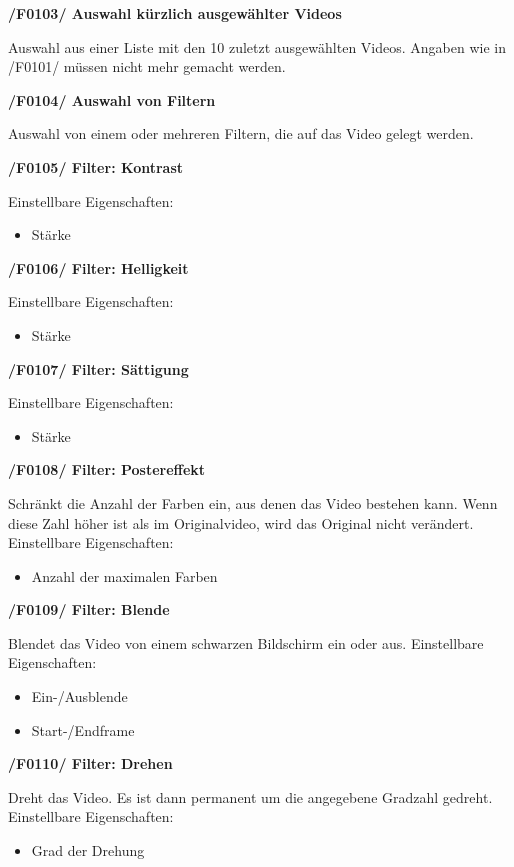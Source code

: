 \documentclass[parskip=full]{scrartcl}
\begin{document}
\textbf{/F0103/ Auswahl kürzlich ausgewählter Videos}

Auswahl aus einer Liste mit den 10 zuletzt ausgewählten Videos. Angaben wie in /F0101/ müssen
nicht mehr gemacht werden.

\textbf{/F0104/ Auswahl von Filtern}

Auswahl von einem oder mehreren Filtern, die auf das Video gelegt werden.

\textbf{/F0105/ Filter: Kontrast}

Einstellbare Eigenschaften:
\begin{itemize}
\item Stärke
\end{itemize}

\textbf{/F0106/ Filter: Helligkeit}

Einstellbare Eigenschaften:
\begin{itemize}
\item Stärke
\end{itemize}

\textbf{/F0107/ Filter: Sättigung}

Einstellbare Eigenschaften:
\begin{itemize}
\item Stärke
\end{itemize}

\textbf{/F0108/ Filter: Postereffekt}

Schränkt die Anzahl der Farben ein, aus denen das Video bestehen kann. Wenn diese Zahl höher ist als im Originalvideo, wird das Original nicht verändert.
Einstellbare Eigenschaften:
\begin{itemize}
\item Anzahl der maximalen Farben
\end{itemize}

\textbf{/F0109/ Filter: Blende}

Blendet das Video von einem schwarzen Bildschirm ein oder aus.
Einstellbare Eigenschaften:
\begin{itemize}
\item Ein-/Ausblende
\item Start-/Endframe
\end{itemize}

\textbf{/F0110/ Filter: Drehen}

Dreht das Video. Es ist dann permanent um die angegebene Gradzahl gedreht.
Einstellbare Eigenschaften:
\begin{itemize}
\item Grad der Drehung
\end{itemize}
\end{document}
